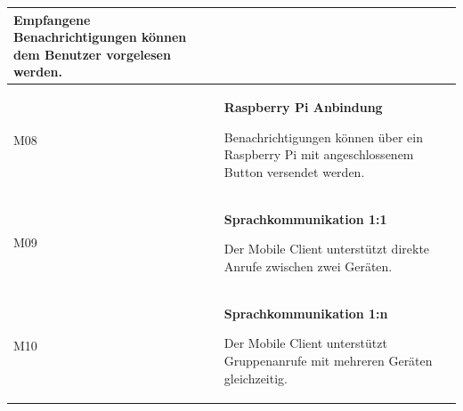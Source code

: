\begin{table}[h]
\begin{tabular}{|l|p{15cm}|}
        Empfangene Benachrichtigungen können dem Benutzer vorgelesen werden. \\
        \hline
        M08         & \textbf{Raspberry Pi Anbindung}

        Benachrichtigungen können über ein Raspberry Pi mit angeschlossenem Button versendet werden. \\
        \hline
        M09         & \textbf{Sprachkommunikation 1:1}

        Der Mobile Client unterstützt direkte Anrufe zwischen zwei Geräten. \\
        \hline
        M10         & \textbf{Sprachkommunikation 1:n}

        Der Mobile Client unterstützt Gruppenanrufe mit mehreren Geräten gleichzeitig. \\
        \hline
    \end{tabular}\label{tab:milestones}
\end{table}
\clearpage


